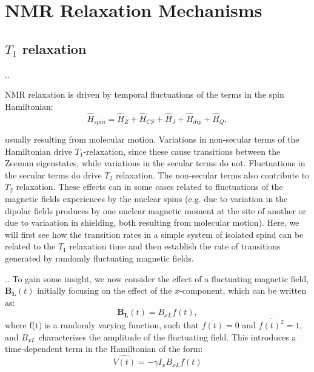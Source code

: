 \documentclass[handout]{beamer}
\begin{document}
\section{NMR Relaxation Mechanisms}
\subsection{$T_1$ relaxation}

\begin{frame}{\thesection.\thesubsection. \insertsubsection}

   NMR relaxation is driven by temporal fluctuations of the terms in the spin Hamiltonian:
   \begin{equation}
     \hat{H}_{spin} = \hat{H}_Z + \hat{H}_{CS} + \hat{H}_J + \hat{H}_{dip} + \hat{H}_Q, 
   \end{equation} 

   usually resulting from molecular motion.     Variations in non-secular terms of the Hamiltonian drive $T_1$-relaxation, since these cause transitions between the Zeeman eigenstates, while variations in the secular terms do not. Fluctuations in the secular terms do drive $T_2$ relaxation. The non-secular terms also contribute to $T_2$ relaxation.
   These effects can in some cases related to fluctuations of the magnetic fields experiences by the nuclear spins (e.g. due to variation in the dipolar fields produces by one nuclear magnetic moment at the site of another or due to variaation in shielding, both resulting from molecular motion). Here, we will first see how the transition rates in a simple system of isolated spind can be related to the $T_1$ relaxation time and then establish the rate of transitions generated by randomly fluctuating magnetic fields.
\end{frame}

\begin{frame}{\thesection.\thesubsection. \insertsubsection}
	\onslide<1>
   To gain some insight, we now consider the effect of a fluctuating magnetic field, $\bm{B_L}(t)$ initially focusing on the effect of the $x$-component, which can be written as:
    \begin{equation}
       \bm{B_L}(t) = B_{xL} f(t),
    \end{equation}
    where f(t) is a randomly varying function, such that $\overline{f(t)} = 0$ and $\overline{f(t)^2} = 1$, and $B_{xL}$ characterizes the amplitude of the fluctuating field.   This introduces a time-dependent term in the Hamiltonian of the form:
    \begin{equation}
      \hat{V(t)} = - \gamma \hat{I}_x B_{xL} f(t)
    \end{equation}


    
\end{frame}
\end{document}
